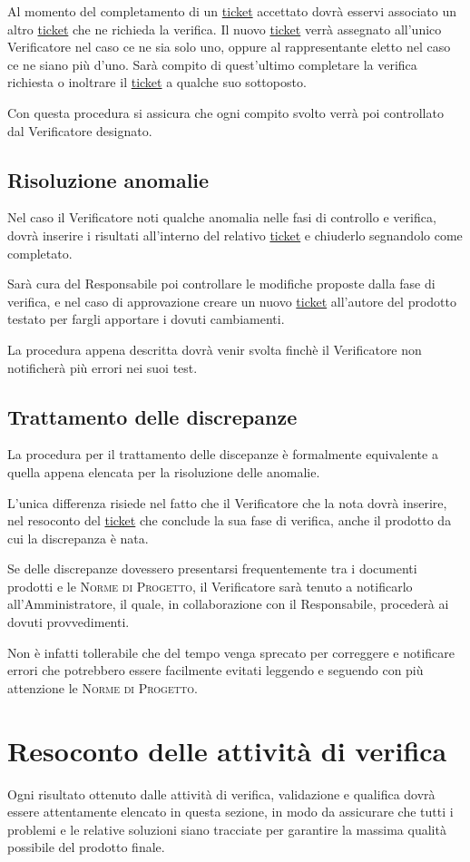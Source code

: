 \documentclass[11pt,a4paper]{article}
\begin{document}
Al momento del completamento di un \underline{ticket} accettato dovrà esservi associato un altro \underline{ticket} che ne richieda la verifica. Il nuovo \underline{ticket} verrà assegnato all'unico Verificatore nel caso ce ne sia solo uno, oppure al rappresentante eletto nel caso ce ne siano più d'uno. Sarà compito di quest'ultimo completare la verifica richiesta o inoltrare il \underline{ticket} a qualche suo sottoposto.

Con questa procedura si assicura che ogni compito svolto verrà poi controllato dal Verificatore designato.
\subsection{Risoluzione anomalie}
Nel caso il Verificatore noti qualche anomalia nelle fasi di controllo e verifica, dovrà inserire i risultati all'interno del relativo \underline{ticket} e chiuderlo segnandolo come completato.

Sarà cura del Responsabile poi controllare le modifiche proposte dalla fase di verifica, e nel caso di approvazione creare un nuovo \underline{ticket} all'autore del prodotto testato per fargli apportare i dovuti cambiamenti.

La procedura appena descritta dovrà venir svolta finchè il Verificatore non notificherà più errori nei suoi test.
\subsection{Trattamento delle discrepanze}
La procedura per il trattamento delle discepanze è formalmente equivalente a quella appena elencata per la risoluzione delle anomalie.

L'unica differenza risiede nel fatto che il Verificatore che la nota dovrà inserire, nel resoconto del \underline{ticket} che conclude la sua fase di verifica, anche il prodotto da cui la discrepanza è nata.

Se delle discrepanze dovessero presentarsi frequentemente tra i documenti prodotti e le \textsc{Norme di Progetto}, il Verificatore sarà tenuto a notificarlo all'Amministratore, il quale, in collaborazione con il Responsabile, procederà ai dovuti provvedimenti.

Non è infatti tollerabile che del tempo venga sprecato per correggere e notificare errori che potrebbero essere facilmente evitati leggendo e seguendo con più attenzione le \textsc{Norme di Progetto}.
\section{Resoconto delle attività di verifica}
Ogni risultato ottenuto dalle attività di verifica, validazione e qualifica dovrà essere attentamente elencato in questa sezione, in modo da assicurare che tutti i problemi e le relative soluzioni siano tracciate per garantire la massima qualità possibile del prodotto finale.
\end{document}
